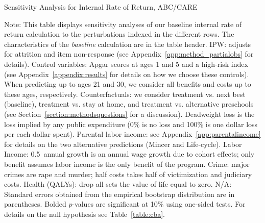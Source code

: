 \begin{table}
\begin{threeparttable}
\caption{Sensitivity Analysis for Internal Rate of Return, ABC/CARE}
\label{table:irrsens}
\centering
\scriptsize

\begin{tablenotes}
\scriptsize
\item Note: This table displays sensitivity analyses of our baseline internal rate of return calculation to the perturbations indexed in the different rows. The characteristics of the \textit{baseline} calculation are in the table header. IPW: adjusts for attrition and item non-response (see  Appendix~\ref{app:method_partialobs} for details). Control variables: Apgar scores at ages 1 and 5 and a high-risk index (see  Appendix~\ref{appendix:results} for details on how we choose these controls). When predicting up to ages 21 and 30, we consider all benefits and costs up to these ages, respectively. Counterfactuals: we consider treatment vs. next best (baseline), treatment vs. stay at home, and treatment vs. alternative preschools (see Section~\ref{section:methodsquestions} for a discussion). Deadweight loss is the loss implied by any public expenditure (0\% is no loss and 100\% is one dollar loss per each dollar spent). Parental labor income: see  Appendix~\ref{app:parentalincome} for details on the two alternative predictions (Mincer and Life-cycle). Labor Income: 0.5\ annual growth is an annual wage growth due to cohort effects; only benefit assumes labor income is the only benefit of the program. Crime: major crimes are rape and murder; half costs takes half of victimization and judiciary costs. Health (QALYs): drop all sets the value of life equal to zero. N/A: Standard errors obtained from the empirical bootstrap distribution are in parentheses. Bolded $p$-values are significant at 10\% using one-sided tests. For details on the null hypothesis see Table~\ref{table:cba}.
\end{tablenotes}
\end{threeparttable}
\end{table}
\doublespacing

